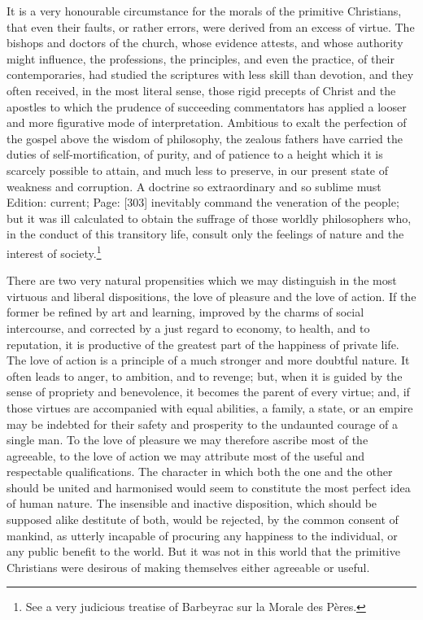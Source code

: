 It is a very honourable circumstance for the morals of the primitive Christians, that even their faults, or rather errors, were derived from an excess of virtue. The bishops and doctors of the church, whose evidence attests, and whose authority might influence, the professions, the principles, and even the practice, of their contemporaries, had studied the scriptures with less skill than devotion, and they often received, in the most literal sense, those rigid precepts of Christ and the apostles to which the prudence of succeeding commentators has applied a looser and more figurative mode of interpretation. Ambitious to exalt the perfection of the gospel above the wisdom of philosophy, the zealous fathers have carried the duties of self-mortification, of purity, and of patience to a height which it is scarcely possible to attain, and much less to preserve, in our present state of weakness and corruption. A doctrine so extraordinary and so sublime must Edition: current; Page: [303] inevitably command the veneration of the people; but it was ill calculated to obtain the suffrage of those worldly philosophers who, in the conduct of this transitory life, consult only the feelings of nature and the interest of society.\footnote{See a very judicious treatise of Barbeyrac sur la Morale des Pères.}

There are two very natural propensities which we may distinguish in the most virtuous and liberal dispositions, the love of pleasure and the love of action. If the former be refined by art and learning, improved by the charms of social intercourse, and corrected by a just regard to economy, to health, and to reputation, it is productive of the greatest part of the happiness of private life. The love of action is a principle of a much stronger and more doubtful nature. It often leads to anger, to ambition, and to revenge; but, when it is guided by the sense of propriety and benevolence, it becomes the parent of every virtue; and, if those virtues are accompanied with equal abilities, a family, a state, or an empire may be indebted for their safety and prosperity to the undaunted courage of a single man. To the love of pleasure we may therefore ascribe most of the agreeable, to the love of action we may attribute most of the useful and respectable qualifications. The character in which both the one and the other should be united and harmonised would seem to constitute the most perfect idea of human nature. The insensible and inactive disposition, which should be supposed alike destitute of both, would be rejected, by the common consent of mankind, as utterly incapable of procuring any happiness to the individual, or any public benefit to the world. But it was not in this world that the primitive Christians were desirous of making themselves either agreeable or useful.

